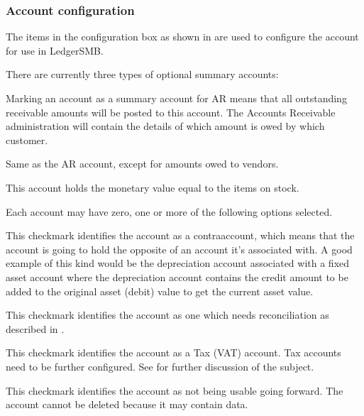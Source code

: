 \subsubsection{Account configuration}
\label{subsec-coa-account-configuration}

The items in the configuration box as shown in  are used to configure the account for use in LedgerSMB.

There are currently three types of optional summary accounts:

\begin{description}[style=nextline]
    \item [AR] Marking an account as a summary account for AR means that all outstanding
    receivable amounts will be posted to this account. The Accounts Receivable administration
    will contain the details of which amount is owed by which \gls{customer}.
    \item [AP] Same as the AR account, except for amounts owed to vendors.
    \item [Inventory] This account holds the monetary value equal to the items on stock.
\end{description}

Each account may have zero, one or more of the following options selected.

\begin{description}[style=nextline]
    \item[Contra] This checkmark identifies the account as a \gls{contra}account, which means
    that the account is going to hold the opposite of an account it's associated with.
    A good example of this kind would be the depreciation account associated with a fixed
    asset account where the depreciation account contains the credit amount to be added to
    the original asset (debit) value to get the current asset value.
    \item[Recon] This checkmark identifies the account as one which needs reconciliation as
    described in .
    \item[Tax] This checkmark identifies the account as a Tax (VAT) account. Tax accounts need
    to be further configured. See  for further discussion of the
    subject.
    \item[Obsolete] This checkmark identifies the account as not being usable going forward.  The account cannot be deleted because it may
    contain data.
    \label{item:AccountOptionsTax}
\end{description}


